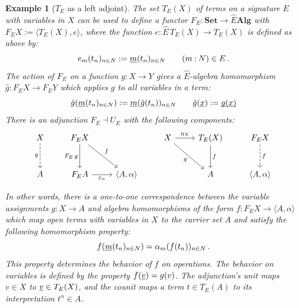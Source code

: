 \documentclass[11pt,oneside,draft]{book}
\newtheorem{example}[theorem]{Example}
\theoremstyle{definition}
\newcommand{\ul}[1]{%
  \underline{\smash{#1}}
}
\begin{document}
\begin{example}[$T_E$ as a left adjoint] %
The set $T_E(X)$ of terms on a signature $E$ with variables in $X$
can be used to define a functor
$F_E : \mathbf{Set} \rightarrow \hat{E} \mathbf{Alg}$
with $F_E X := \langle T_E(X), e \rangle$,
where the function
$e : \hat{E} \, T_E(X) \rightarrow T_E(X)$
is defined as above by:
\[
  e_m(t_n)_{n \in N} := \ul{m}(t_n)_{n \in N}
  \qquad
  (m \mathbin{:} N) \in E
  \,.
\]
The action of $F_E$ on a function $g : X \rightarrow Y$
gives a $\hat{E}$-algebra homomorphism
$\hat{g} : F_E X \rightarrow F_E Y$
which applies $g$ to all variables in a term:
\[
  \hat{g}(\ul{m}(t_n)_{n \in N}) := \ul{m}(\hat{g}(t_n))_{n \in N}
  \qquad
  \hat{g}(\ul{x}) := \ul{g(x)}
\]
There is an adjunction $F_E \dashv U_E$
with the following components:
\[
  \begin{tikzcd}[row sep=large]
    X \ar[d, "g"', dashed] &
    F_E X \ar[d, "F_E \, g"'] \ar[dr, "f"] &
    &
    X \ar[r, "\eta_X"] \ar[dr, "g"'] &
    T_E(X) \ar[d, "f"] &
    F_E X \ar[d, "f", dashed]
    \\
    A &
    F_E A \ar[r, "\varepsilon_\alpha"'] &
    \langle A, \alpha \rangle &
    &
    A &
    \langle A, \alpha \rangle
  \end{tikzcd}
\]

In other words,
there is a one-to-one correspondence between
the variable assignments
$g : X \rightarrow A$
and algebra homomorphisms of the form
$f : F_E X \rightarrow \langle A, \alpha \rangle$
which map open terms with variables in $X$ to
the carrier set $A$
and satisfy
the following homomorphism property:
\[
  f(\ul{m}(t_n)_{n \in N}) = \alpha_m(f(t_n))_{n \in N}
  \,.
\]
This property determines the behavior of $f$ on operations.
The behavior on variables
is defined by the property $f(\ul{v}) = g(v)$.
The adjunction's unit maps $v \in X$ to $\ul{v} \in T_E(X)$,
and the counit maps a term $t \in T_E(A)$
to its interpretation $t^\alpha \in A$.
\end{example}
\end{document}
